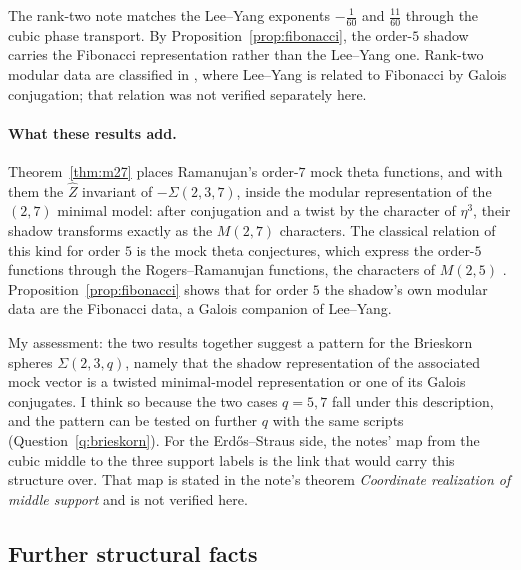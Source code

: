 The rank-two note matches the Lee--Yang exponents $-\tfrac1{60}$ and $\tfrac{11}{60}$ through the cubic phase transport. By Proposition~\ref{prop:fibonacci}, the order-$5$ shadow carries the Fibonacci representation rather than the Lee--Yang one. Rank-two modular data are classified in \cite{RSW}, where Lee--Yang is related to Fibonacci by Galois conjugation; that relation was not verified separately here.

\paragraph{What these results add.}
Theorem~\ref{thm:m27} places Ramanujan's order-$7$ mock theta functions, and with them the $\widehat Z$ invariant of $-\Sigma(2,3,7)$, inside the modular representation of the $(2,7)$ minimal model: after conjugation and a twist by the character of $\eta^3$, their shadow transforms exactly as the $M(2,7)$ characters. The classical relation of this kind for order $5$ is the mock theta conjectures, which express the order-$5$ functions through the Rogers--Ramanujan functions, the characters of $M(2,5)$ \cite{AndrewsGarvan,Hickerson}. Proposition~\ref{prop:fibonacci} shows that for order $5$ the shadow's own modular data are the Fibonacci data, a Galois companion of Lee--Yang.

My assessment: the two results together suggest a pattern for the Brieskorn spheres $\Sigma(2,3,q)$, namely that the shadow representation of the associated mock vector is a twisted minimal-model representation or one of its Galois conjugates. I think so because the two cases $q=5,7$ fall under this description, and the pattern can be tested on further $q$ with the same scripts (Question~\ref{q:brieskorn}). For the Erdős--Straus side, the notes' map from the cubic middle to the three support labels is the link that would carry this structure over. That map is stated in the note's theorem \emph{Coordinate realization of middle support} and is not verified here.

\subsection{Further structural facts}\label{ssec:structfacts}


